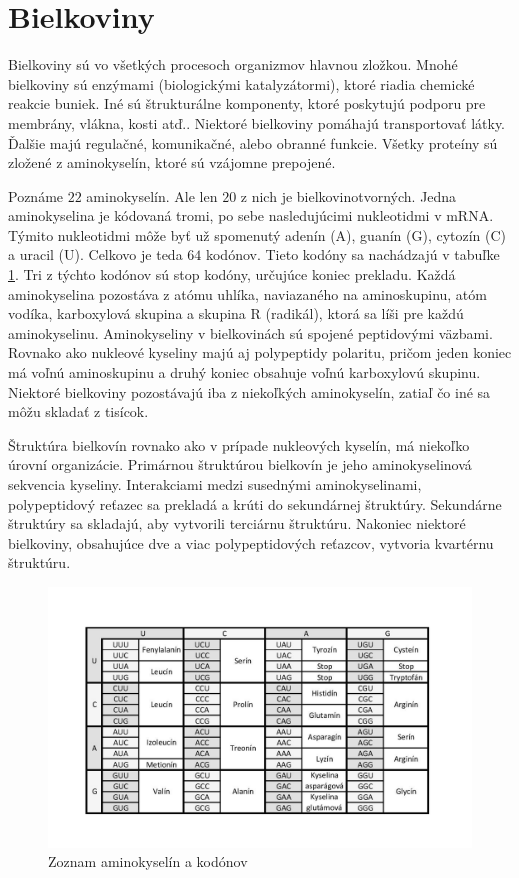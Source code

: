 \section{Bielkoviny}
Bielkoviny sú vo všetkých procesoch organizmov hlavnou zložkou.
Mnohé bielkoviny sú enzýmami (biologickými katalyzátormi), ktoré riadia chemické reakcie buniek. Iné sú štrukturálne
komponenty, ktoré poskytujú podporu pre membrány, vlákna, kosti atď.. Niektoré bielkoviny pomáhajú transportovať látky. Ďalšie majú regulačné, komunikačné,
alebo obranné funkcie. Všetky proteíny sú zložené z aminokyselín, ktoré sú
vzájomne prepojené.

Poznáme $22$ aminokyselín. Ale len $20$ z nich je bielkovinotvorných.
Jedna aminokyselina je kódovaná tromi, po sebe nasledujúcimi nukleotidmi v mRNA. Týmito nukleotidmi môže byť už spomenutý adenín (A), guanín (G), cytozín (C) a uracil (U). Celkovo je teda $64$ kodónov. Tieto kodóny sa nachádzajú v tabuľke \ref{obrgeny}. Tri z týchto kodónov sú stop kodóny, určujúce koniec prekladu.
Každá aminokyselina  pozostáva z atómu uhlíka, naviazaného na aminoskupinu,
atóm vodíka, karboxylová skupina a skupina R (radikál), ktorá sa líši pre každú aminokyselinu. Aminokyseliny v bielkovinách sú
spojené peptidovými väzbami. Rovnako ako nukleové kyseliny majú aj polypeptidy
polaritu, pričom jeden koniec má voľnú aminoskupinu a druhý koniec obsahuje voľnú karboxylovú skupinu.
Niektoré bielkoviny pozostávajú iba z niekoľkých aminokyselín, zatiaľ čo
iné sa môžu skladať z tisícok.

Štruktúra bielkovín rovnako ako v prípade nukleových kyselín, má niekoľko úrovní organizácie.
Primárnou štruktúrou bielkovín je jeho aminokyselinová sekvencia
kyseliny. Interakciami medzi susednými aminokyselinami, polypeptidový reťazec sa prekladá a krúti
do sekundárnej štruktúry. Sekundárne štruktúry
sa skladajú, aby vytvorili terciárnu štruktúru. Nakoniec niektoré bielkoviny, obsahujúce dve a viac polypeptidových reťazcov, vytvoria kvartérnu štruktúru.
\newpage
\begin{figure}[!ht]
\centering
\includegraphics[scale =0.8]{obrazky-figures/geny02.jpg}
\caption{Zoznam aminokyselín a kodónov}
\label{obrgeny}
\end{figure}


